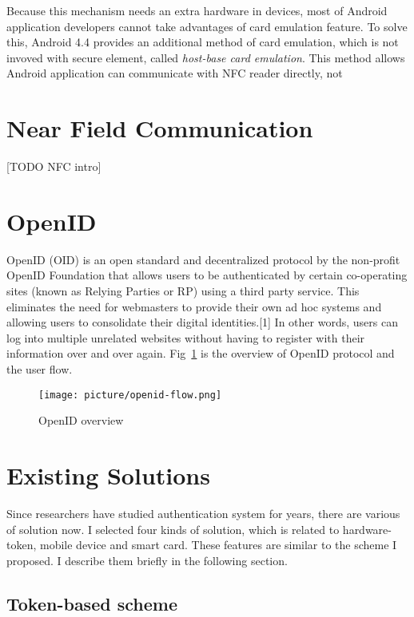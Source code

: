 \begin{CJK}{Bg5}{bsmi}
Because this mechanism needs an extra hardware in devices, most of Android application developers cannot take advantages of card emulation feature. To solve this, Android 4.4 provides an additional method of card emulation, which is not invoved with secure element, called \emph{host-base card emulation}. This method allows Android application can communicate with NFC reader directly, not 

\section{Near Field Communication}

[TODO NFC intro]
\begin{comment}
should put the comparision with bluetooth
\end{comment}

\section{OpenID}

OpenID (OID) is an open standard and decentralized protocol by the non-profit OpenID Foundation that allows users to be authenticated by certain co-operating sites (known as Relying Parties or RP) using a third party service. This eliminates the need for webmasters to provide their own ad hoc systems and allowing users to consolidate their digital identities.[1] In other words, users can log into multiple unrelated websites without having to register with their information over and over again. Fig~\ref{fig:openid-flow} is the overview of OpenID protocol and the user flow.
\begin{figure}
\centering
\texttt{[image: picture/openid-flow.png]}
\caption{OpenID overview}
\label{fig:openid-flow}
\end{figure}

\section{Existing Solutions}

Since researchers have studied authentication system for years, there are various of solution now. I selected four kinds of solution, which is related to hardware-token, mobile device and smart card. These features are similar to the scheme I proposed. I describe them briefly in the following section.

\subsection{Token-based scheme}


\end{CJK}
